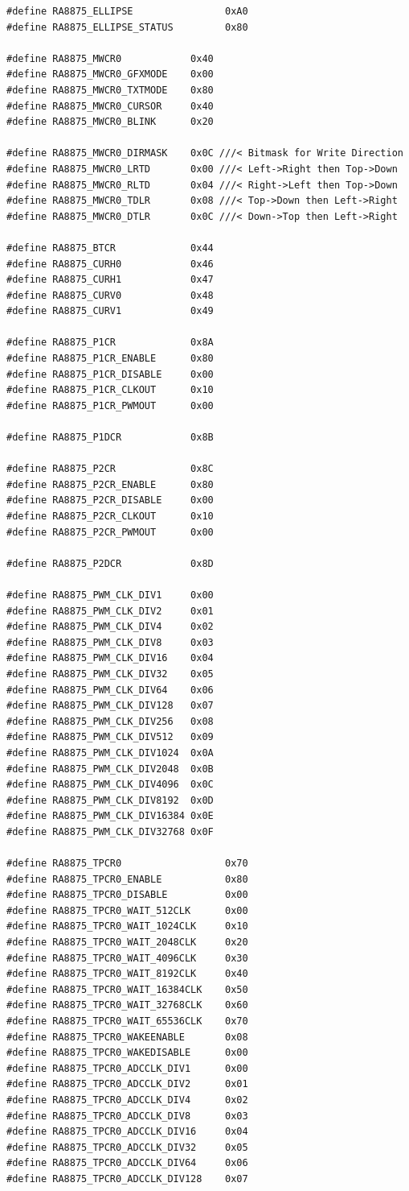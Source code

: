 \documentclass[a4paper, 12pt]{article}
\begin{document}
\begin{verbatim}
#define RA8875_ELLIPSE                0xA0
#define RA8875_ELLIPSE_STATUS         0x80

#define RA8875_MWCR0            0x40
#define RA8875_MWCR0_GFXMODE    0x00
#define RA8875_MWCR0_TXTMODE    0x80
#define RA8875_MWCR0_CURSOR     0x40
#define RA8875_MWCR0_BLINK      0x20

#define RA8875_MWCR0_DIRMASK    0x0C ///< Bitmask for Write Direction
#define RA8875_MWCR0_LRTD       0x00 ///< Left->Right then Top->Down
#define RA8875_MWCR0_RLTD       0x04 ///< Right->Left then Top->Down
#define RA8875_MWCR0_TDLR       0x08 ///< Top->Down then Left->Right
#define RA8875_MWCR0_DTLR       0x0C ///< Down->Top then Left->Right

#define RA8875_BTCR             0x44
#define RA8875_CURH0            0x46
#define RA8875_CURH1            0x47
#define RA8875_CURV0            0x48
#define RA8875_CURV1            0x49

#define RA8875_P1CR             0x8A
#define RA8875_P1CR_ENABLE      0x80
#define RA8875_P1CR_DISABLE     0x00
#define RA8875_P1CR_CLKOUT      0x10
#define RA8875_P1CR_PWMOUT      0x00

#define RA8875_P1DCR            0x8B

#define RA8875_P2CR             0x8C
#define RA8875_P2CR_ENABLE      0x80
#define RA8875_P2CR_DISABLE     0x00
#define RA8875_P2CR_CLKOUT      0x10
#define RA8875_P2CR_PWMOUT      0x00

#define RA8875_P2DCR            0x8D

#define RA8875_PWM_CLK_DIV1     0x00
#define RA8875_PWM_CLK_DIV2     0x01
#define RA8875_PWM_CLK_DIV4     0x02
#define RA8875_PWM_CLK_DIV8     0x03
#define RA8875_PWM_CLK_DIV16    0x04
#define RA8875_PWM_CLK_DIV32    0x05
#define RA8875_PWM_CLK_DIV64    0x06
#define RA8875_PWM_CLK_DIV128   0x07
#define RA8875_PWM_CLK_DIV256   0x08
#define RA8875_PWM_CLK_DIV512   0x09
#define RA8875_PWM_CLK_DIV1024  0x0A
#define RA8875_PWM_CLK_DIV2048  0x0B
#define RA8875_PWM_CLK_DIV4096  0x0C
#define RA8875_PWM_CLK_DIV8192  0x0D
#define RA8875_PWM_CLK_DIV16384 0x0E
#define RA8875_PWM_CLK_DIV32768 0x0F

#define RA8875_TPCR0                  0x70
#define RA8875_TPCR0_ENABLE           0x80
#define RA8875_TPCR0_DISABLE          0x00
#define RA8875_TPCR0_WAIT_512CLK      0x00
#define RA8875_TPCR0_WAIT_1024CLK     0x10
#define RA8875_TPCR0_WAIT_2048CLK     0x20
#define RA8875_TPCR0_WAIT_4096CLK     0x30
#define RA8875_TPCR0_WAIT_8192CLK     0x40
#define RA8875_TPCR0_WAIT_16384CLK    0x50
#define RA8875_TPCR0_WAIT_32768CLK    0x60
#define RA8875_TPCR0_WAIT_65536CLK    0x70
#define RA8875_TPCR0_WAKEENABLE       0x08
#define RA8875_TPCR0_WAKEDISABLE      0x00
#define RA8875_TPCR0_ADCCLK_DIV1      0x00
#define RA8875_TPCR0_ADCCLK_DIV2      0x01
#define RA8875_TPCR0_ADCCLK_DIV4      0x02
#define RA8875_TPCR0_ADCCLK_DIV8      0x03
#define RA8875_TPCR0_ADCCLK_DIV16     0x04
#define RA8875_TPCR0_ADCCLK_DIV32     0x05
#define RA8875_TPCR0_ADCCLK_DIV64     0x06
#define RA8875_TPCR0_ADCCLK_DIV128    0x07


\end{verbatim}
\end{document}
